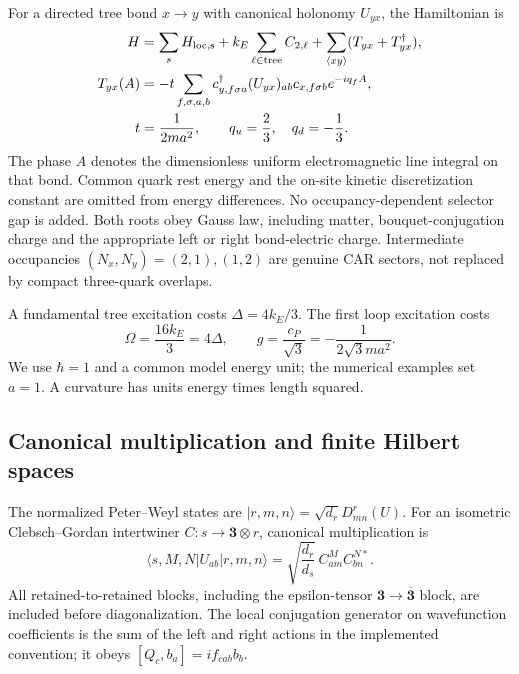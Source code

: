 \documentclass[11pt]{article}
\newcommand{\ket}[1]{\lvert #1\rangle}
\newcommand{\bra}[1]{\langle #1\rvert}
\begin{document}
For a directed tree bond $x\to y$ with canonical holonomy $U_{yx}$, the Hamiltonian is
\begin{align}
 H&=\sum_s H_{\rm loc,s}+k_E\sum_{\ell\in\mathrm{tree}}C_{2,\ell}
       +\sum_{\langle xy\rangle}(T_{yx}+T_{yx}^\dagger),\\
 T_{yx}(A)&=-t\sum_{f,\sigma,a,b}c^\dagger_{y,f\sigma a}(U_{yx})_{ab}
                  c_{x,f\sigma b}e^{-iq_f A},\\
 t&=\frac{1}{2ma^2},\qquad q_u=\frac23,\quad q_d=-\frac13. \label{eq:tree}
\end{align}
The phase $A$ denotes the dimensionless uniform electromagnetic line integral on that bond. Common quark rest energy and the on-site kinetic discretization constant are omitted from energy differences. No occupancy-dependent selector gap is added. Both roots obey Gauss law, including matter, bouquet-conjugation charge and the appropriate left or right bond-electric charge. Intermediate occupancies $(N_x,N_y)=(2,1),(1,2)$ are genuine CAR sectors, not replaced by compact three-quark overlaps.

A fundamental tree excitation costs $\Delta=4k_E/3$. The first loop excitation costs
\begin{equation}
 \Omega=\frac{16k_E}{3}=4\Delta,\qquad
 g=\frac{c_P}{\sqrt3}=-\frac{1}{2\sqrt3ma^2}. \label{eq:matching}
\end{equation}
We use $\hbar=1$ and a common model energy unit; the numerical examples set $a=1$. A curvature has units energy times length squared.

\subsection{Canonical multiplication and finite Hilbert spaces}
The normalized Peter--Weyl states are $\ket{r,m,n}=\sqrt{d_r}D^r_{mn}(U)$. For an isometric Clebsch--Gordan intertwiner $C: s\to\mathbf3\otimes r$, canonical multiplication is
\begin{equation}
 \bra{s,M,N}U_{ab}\ket{r,m,n}
 =\sqrt{\frac{d_r}{d_s}}\,C^M_{am}C^{N*}_{bn}. \label{eq:PW}
\end{equation}
All retained-to-retained blocks, including the epsilon-tensor $\mathbf3\to\overline{\mathbf3}$ block, are included before diagonalization. The local conjugation generator on wavefunction coefficients is the sum of the left and right actions in the implemented convention; it obeys $[Q_c,b_a]=if_{cab}b_b$.
\end{document}
